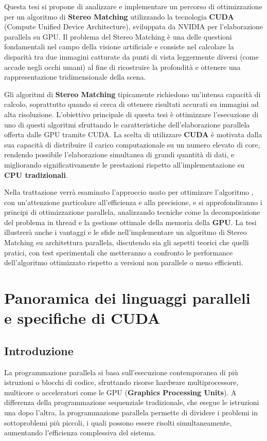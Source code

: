 \documentclass[12pt,a4paper]{report}
\begin{document}
Questa tesi si propone di analizzare e implementare un percorso di ottimizzazione per un algoritmo di \textbf{Stereo Matching} utilizzando la tecnologia \textbf{CUDA} (Compute Unified Device Architecture), sviluppata da NVIDIA per l'elaborazione parallela su GPU. Il problema del Stereo Matching è una delle questioni fondamentali nel campo della visione artificiale e consiste nel calcolare la disparità tra due immagini catturate da punti di vista leggermente diversi (come accade negli occhi umani) al fine di ricostruire la profondità e ottenere una rappresentazione tridimensionale della scena.

Gli algoritmi di \textbf{Stereo Matching} tipicamente richiedono un'intensa capacità di calcolo, soprattutto quando si cerca di ottenere risultati accurati su immagini ad alta risoluzione. L’obiettivo principale di questa tesi è ottimizzare l'esecuzione di uno di questi algoritmi sfruttando le caratteristiche dell'elaborazione parallela offerta dalle GPU tramite CUDA. La scelta di utilizzare \textbf{CUDA} è motivata dalla sua capacità di distribuire il carico computazionale su un numero elevato di core, rendendo possibile l’elaborazione simultanea di grandi quantità di dati, e migliorando significativamente le prestazioni rispetto all'implementazione su \textbf{CPU tradizionali}.

Nella trattazione verrà esaminato l'approccio usato per ottimizare l'algoritmo  , con un'attenzione particolare all'efficienza e alla precisione, e si approfondiranno i principi di ottimizzazione parallela, analizzando tecniche come la decomposizione del problema in thread e la gestione ottimale della memoria della \textbf{GPU}. La tesi illustrerà anche i vantaggi e le sfide nell'implementare un algoritmo di Stereo Matching su architettura parallela, discutendo sia gli aspetti teorici che quelli pratici, con test sperimentali che metteranno a confronto le performance dell'algoritmo ottimizzato rispetto a versioni non parallele o meno efficienti.



\chapter{Panoramica dei linguaggi paralleli e specifiche di CUDA}

\section{Introduzione}

La programmazione parallela si basa sull’esecuzione contemporanea di più istruzioni o blocchi di codice, sfruttando risorse hardware multiprocessore, multicore o acceleratori come le GPU (\textbf{Graphics Processing Units}). A differenza della programmazione sequenziale tradizionale, che esegue le istruzioni una dopo l’altra, la programmazione parallela permette di dividere i problemi in sottoproblemi più piccoli, i quali possono essere risolti simultaneamente, aumentando l’efficienza complessiva del sistema.
\end{document}
